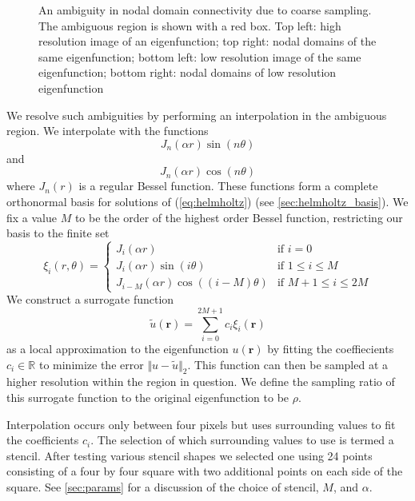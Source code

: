 \documentclass{report}
\newcommand{\rr}[0]{\mathbf{r}}
\begin{document}
\begin{figure}[h!]
\begin{center}
    \caption{An ambiguity in nodal domain connectivity due to coarse sampling. The ambiguous region is shown with a red box. Top left: high resolution image of an eigenfunction; top right: nodal domains of the same eigenfunction; bottom left: low resolution image of the same eigenfunction; bottom right: nodal domains of low resolution eigenfunction}
    \label{fig:interpolation_sample}
  \end{center}
\end{figure}

We resolve such ambiguities by performing an interpolation in the ambiguous region. We interpolate with the functions
\[
J_{n}(\alpha r) \sin(n \theta)
\]
and
\[
J_{n}(\alpha r) \cos(n \theta)
\]
where $J_{n}(r)$ is a regular Bessel function. These functions form a complete orthonormal basis for solutions of (\ref{eq:helmholtz}) (see \ref{sec:helmholtz_basis}). We fix a value $M$ to be the order of the highest order Bessel function, restricting our basis to the finite set
\begin{equation}
  \label{eq:interp_functions}
  \xi_{i}(r, \theta)=\begin{cases}
  J_{i}(\alpha r) & \text{if }i=0\\
  J_{i}(\alpha r)\sin(i\theta) & \text{if }1 \le i \le M\\
  J_{i-M}(\alpha r)\cos((i-M)\theta) & \text{if }M+1 \le i \le 2M
  \end{cases}
\end{equation}
We construct a surrogate function
\[
  \tilde{u}(\rr) = \sum_{i=0}^{2M+1} c_{i} \xi_{i}(\rr)
\]
as a local approximation to the eigenfunction $u(\rr)$ by fitting the coeffiecients $c_{i} \in \mathbb{R}$ to minimize the error $\Vert u - \tilde{u} \Vert_{2}$. This function can then be sampled at a higher resolution within the region in question. We define the sampling ratio of this surrogate function to the original eigenfunction to be $\rho$.

Interpolation occurs only between four pixels but uses surrounding values to fit the coefficients $c_i$. The selection of which surrounding values to use is termed a stencil. After testing various stencil shapes we selected one using 24 points consisting of a four by four square with two additional points on each side of the square. See \ref{sec:params} for a discussion of the choice of stencil, $M$, and $\alpha$.
\end{document}
